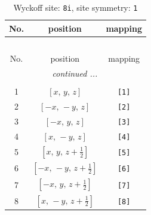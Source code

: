\documentclass[fleqn,8pt]{jsarticle}
\begin{document}
\renewcommand{\arraystretch}{1.2}
\begin{longtable}{ccc}
\caption{Wyckoff site: {\tt 8i}, site symmetry: {\tt 1}}
 \\
 \hline \hline
No. & position & mapping \\ \hline \endfirsthead

\multicolumn{2}{l}{\tablename\ \thetable{}} \\
 \hline \hline
No. & position & mapping \\ \hline \endhead

 \hline \hline
\multicolumn{2}{r}{\footnotesize\it continued ...} \\ \endfoot

 \hline \hline
\multicolumn{2}{r}{} \\ \endlastfoot

1 & $\left[ x,\, y,\, z \right]$ & {\tt [1]} \\ \hline
2 & $\left[ - x,\, - y,\, z \right]$ & {\tt [2]} \\ \hline
3 & $\left[ - x,\, y,\, z \right]$ & {\tt [3]} \\ \hline
4 & $\left[ x,\, - y,\, z \right]$ & {\tt [4]} \\ \hline
5 & $\left[ x,\, y,\, z + \frac{1}{2} \right]$ & {\tt [5]} \\ \hline
6 & $\left[ - x,\, - y,\, z + \frac{1}{2} \right]$ & {\tt [6]} \\ \hline
7 & $\left[ - x,\, y,\, z + \frac{1}{2} \right]$ & {\tt [7]} \\ \hline
8 & $\left[ x,\, - y,\, z + \frac{1}{2} \right]$ & {\tt [8]} \\
\end{longtable}
\end{document}
